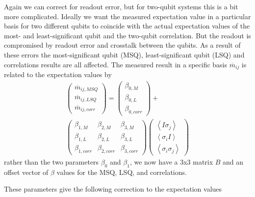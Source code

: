 Again we can correct for readout error, but for two-qubit systems this is a bit
more complicated. Ideally we want the measured expectation value in a particular
basis for two different qubits to coincide with the actual expectation values of
the most- and least-significant qubit and the two-qubit correlation. But the
readout is compromised by readout error and crosstalk between the qubits. As a
result of these errors the most-significant qubit (MSQ), least-significant qubit
(LSQ) and correlations results are all affected. The measured result
in a specific basis $\overline{m}_{ij}$ is related to the expectation values by
\begin{equation}
\label{beta}
\begin{split}
\begin{pmatrix} \overline{m}_{ij,MSQ} \\ \overline{m}_{ij,LSQ} \\
\overline{m}_{ij,corr}
\end{pmatrix}=\begin{pmatrix} \beta_{0,M} \\ \beta_{0,L} \\ \beta_{0,corr}
\end{pmatrix}+\\\begin{pmatrix} \beta_{1,M}&\beta_{2,M}&\beta_{3,M} \\
\beta_{1,L}&\beta_{2,L}&\beta_{3,L} \\
\beta_{1,corr}&\beta_{2,corr}&\beta_{3,corr}
\end{pmatrix}\begin{pmatrix} \left\langle I\sigma_j\right\rangle \\ \left\langle
\sigma_iI\right\rangle \\ \left\langle \sigma_i\sigma_j\right\rangle
\end{pmatrix}
\end{split}
\end{equation}
rather than the two parameters $\beta_0$ and $\beta_1$, we now have a 3x3
matrix $B$ and an offset vector of $\beta$ values for the MSQ, LSQ, and
correlations. 

These parameters give the following correction to the expectation values

